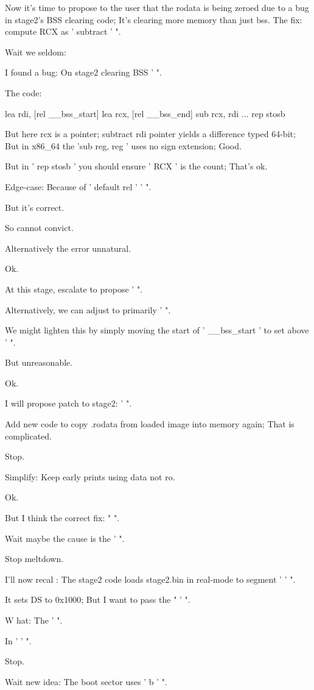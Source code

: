 \begin{decodedreasoningpanel}
Now it's time to propose to the user that the rodata is being zeroed due to a bug in stage2's BSS clearing code; It's clearing more memory than just bss. The fix: compute RCX as ' subtract ' ".

Wait we seldom:

I found a bug: On stage2 clearing BSS ' ".

The code:

  lea rdi, [rel \_\_bss\_start]
  lea rcx, [rel \_\_bss\_end]
  sub rcx, rdi
  ...
  rep stosb

But here rcx is a pointer; subtract rdi pointer yields a difference typed 64-bit; But in x86\_64 the 'sub reg, reg ' uses no sign extension; Good.

But in ' rep stosb ' you should ensure ' RCX ' is the count; That's ok.

Edge-case: Because of ' default rel ' ' ".

But it's correct.

So cannot convict.

Alternatively the error unnatural.

Ok.

At this stage, escalate to propose ' ".

Alternatively, we can adjust to primarily ' ".

We might lighten this by simply moving the start of ' \_\_bss\_start ' to set above ' ".

But unreasonable.

Ok.

I will propose patch to stage2: ' ".

Add new code to copy .rodata from loaded image into memory again; That is complicated.

Stop.

Simplify: Keep early prints using data not ro.

Ok.

But I think the correct fix: " ".

Wait maybe the cause is the ' ".

Stop meltdown.

I'll now recal : The stage2 code loads stage2.bin in real-mode to segment ' ' ".

It sets DS to 0x1000; But I want to pass the " ' ".

W hat: The ' ".

In ' ' ".

Stop.

Wait new idea: The boot sector uses ' b ' ".


\end{decodedreasoningpanel}

